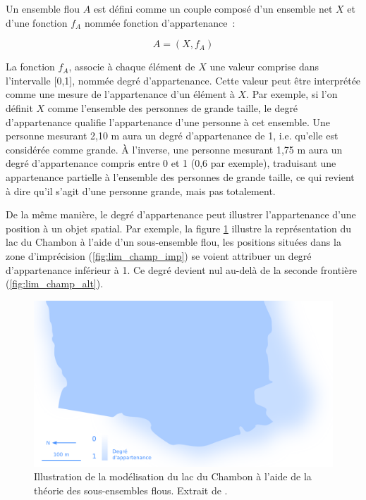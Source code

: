 Un ensemble flou $A$ est défini comme un couple composé d’un ensemble
net $X$ et d’une fonction $f_A$ nommée fonction d’appartenance :

\begin{equation}
  \label{eq:def_ensemble_flou}
  A = (X, f_A)  
\end{equation}

La fonction $f_A$, associe à chaque élément de $X$ une valeur comprise
dans l’intervalle [0,1], nommée degré d’appartenance. Cette valeur
peut être interprétée comme une mesure de l’appartenance d’un élément
à $X$. Par exemple, si l’on définit $X$ comme l’ensemble des personnes
de grande taille, le degré d’appartenance qualifie l’appartenance
d’une personne à cet ensemble. Une personne mesurant 2,10 m aura un
degré d’appartenance de 1, i.e. qu’elle est considérée comme grande. À
l’inverse, une personne mesurant 1,75 m aura un degré d’appartenance
compris entre 0 et 1 (0,6 par exemple), traduisant une appartenance
partielle à l’ensemble des personnes de grande taille, ce qui revient
à dire qu’il s’agit d’une personne grande, mais pas totalement.

De la même manière, le degré d’appartenance peut illustrer
l’appartenance d’une position à un objet spatial. Par exemple, la
figure \ref{fig:champ_flou} illustre la représentation du lac du
Chambon à l’aide d’un sous-ensemble flou, les positions situées dans
la zone d’imprécision (\autoref{fig:lim_champ_imp}) se voient
attribuer un degré d’appartenance inférieur à 1. Ce degré devient nul
au-delà de la seconde frontière (\autoref{fig:lim_champ_alt}).

\begin{figure}
  \centering
  \includegraphics{../figures/fig6.png}
  \caption{Illustration de la modélisation du lac du Chambon à l’aide
    de la théorie des sous-ensembles flous. Extrait de
    \textcite{Bunel2020}.}
  \label{fig:champ_flou}
\end{figure}

